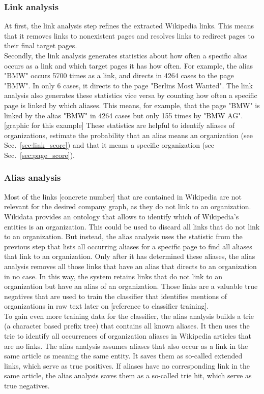 \subsubsection{Link analysis}
At first, the link analysis step refines the extracted Wikipedia links. This means that it removes links to nonexistent pages and resolves links to redirect pages to their final target pages.\\
Secondly, the link analysis generates statistics about how often a specific alias occurs as a link and which target pages it has how often. For example, the alias "BMW" occurs 5700 times as a link, and directs in 4264 cases to the page "BMW". In only 6 cases, it directs to the page "Berlins Most Wanted". The link analysis also generates these statistics vice versa by counting how often a specific page is linked by which aliases. This means, for example, that the page "BMW" is linked by the alias "BMW" in 4264 cases but only 155 times by "BMW AG". [graphic for this example] These statistics are helpful to identify aliases of organizations, estimate the probability that an alias means an organization (see Sec.~\ref{sec:link_score}) and that it means a specific organization (see Sec.~\ref{sec:page_score}).\\

\subsubsection{Alias analysis}
Most of the links [concrete number] that are contained in Wikipedia are not relevant for the desired company graph, as they do not link to an organization. Wikidata provides an ontology that allows to identify which of Wikipedia's entities is an organization. This could be used to discard all links that do not link to an organization. But instead, the alias analysis uses the statistic from the previous step that lists all occurring aliases for a specific page to find all aliases that link to an organization. Only after it has determined these aliases, the alias analysis removes all those links that have an alias that directs to an organization in no case. In this way, the system retains links that do not link to an organization but have an alias of an organization. Those links are a valuable true negatives that are used to train the classifier that identifies mentions of organizations in raw text later on [reference to classifier training].\\
To gain even more training data for the classifier, the alias analysis builds a trie (a character based prefix tree) that contains all known aliases. It then uses the trie to identify all occurrences of organization aliases in Wikipedia articles that are no links. The alias analysis assumes aliases that also occur as a link in the same article as meaning the same entity. It saves them as so-called extended links, which serve as true positives. If aliases have no corresponding link in the same article, the alias analysis saves them as a so-called trie hit, which serve as true negatives.\\

